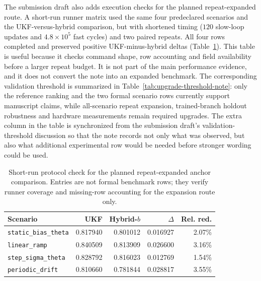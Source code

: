 \documentclass[11pt]{article}
\begin{document}
The submission draft also adds execution checks for the planned repeat-expanded
route.  A short-run runner matrix used the same four predeclared scenarios and
the UKF-versus-hybrid comparison, but with shortened timing
(\(120\) slow-loop updates and \(4.8\times10^5\) fast cycles) and two paired
repeats.  All four rows completed and preserved positive UKF-minus-hybrid
deltas (Table~\ref{tab:runner-smoke-note}).  This table is useful because it
checks command shape, row accounting and field availability before a larger
repeat budget.  It is not part of the main performance evidence, and it does
not convert the note into an expanded benchmark.
The corresponding validation threshold is summarized in
Table~\ref{tab:upgrade-threshold-note}: only the reference ranking and the two formal
scenario rows currently support manuscript claims, while all-scenario
repeat expansion, trained-branch holdout robustness and hardware measurements
remain required upgrades.  The extra column in the table is synchronized from
the submission draft's validation-threshold discussion so that the note records
not only what was observed, but also what additional experimental row would be
needed before stronger wording could be used.

\begin{table}[ht]
\centering
\small
\begin{tabular}{lrrrr}
\toprule
Scenario & UKF & Hybrid-\(b\) & \(\Delta\) & Rel. red. \\
\midrule
\texttt{static\_bias\_theta} & 0.817940 & 0.801012 & 0.016927 & 2.07\% \\
\texttt{linear\_ramp} & 0.840509 & 0.813909 & 0.026600 & 3.16\% \\
\texttt{step\_sigma\_theta} & 0.828792 & 0.816023 & 0.012769 & 1.54\% \\
\texttt{periodic\_drift} & 0.810660 & 0.781844 & 0.028817 & 3.55\% \\
\bottomrule
\end{tabular}
\caption{Short-run protocol check for the planned repeat-expanded anchor
comparison.  Entries are not formal benchmark rows; they verify runner
coverage and missing-row accounting for the expansion route only.}
\label{tab:runner-smoke-note}
\end{table}
\end{document}
